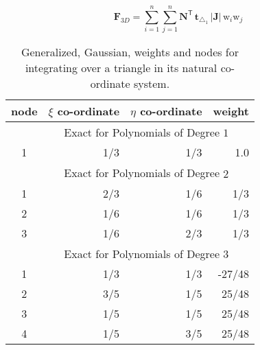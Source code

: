 \begin{equation}
\mathbf{F}_{3D} = \sum_{i=1}^{n} \sum_{j=1}^{n} \mathbf{N}^{\mathsf{T}} \, \mathbf{t}_{\triangle_{1}} \,|\mathbf{J}| \, \mathrm{w}_i \mathrm{w}_j 
\end{equation}



\begin{table}
	\centering
	\begin{tabular}{|c|rrr|}
		\hline
		node & $\xi$ co-ordinate   & 
		$\eta$ co-ordinate & weight \\   \hline        
		& \multicolumn{3}{|c|}{Exact for Polynomials of Degree $1^{\phantom{|^|}}$} \\ 
		\hline
		1 & 1/3 & 1/3 & 1.0 \\ 
		\hline
		& \multicolumn{3}{|c|}{Exact for Polynomials of Degree $2^{\phantom{|^|}}$} \\ 
		\hline
		1 & 2/3 & 1/6 & 1/3\\
		2 & 1/6 & 1/6 & 1/3\\
		3 & 1/6 & 2/3 & 1/3\\ 
		\hline
		& \multicolumn{3}{|c|}{Exact for Polynomials of Degree $3^{\phantom{|^|}}$} \\ \hline
		1 & 1/3 & 1/3 & -27/48 \\
		2 & 3/5 & 1/5 & 25/48 \\
		3 & 1/5 & 1/5 & 25/48 \\ 
		4 & 1/5 & 3/5 & 25/48 \\
		\hline
	\end{tabular}
	\caption{Generalized, Gaussian, weights and nodes for integrating over a triangle in its natural co-ordinate system.}
	\label{tabGaussPointsTriangle}
\end{table}

